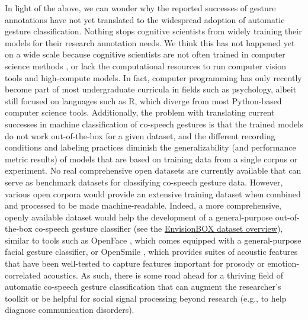 \documentclass[11pt,smallheadings,cleardoublepage=empty,tocflat,numbers=noenddot,twoside,captions=tableheading]{scrbook}
\begin{document}
\begin{refsection}
In light of the above, we can wonder why the reported successes of gesture annotations have not yet translated to the widespread adoption of automatic gesture classification. Nothing stops cognitive scientists from widely training their models for their research annotation needs. We think this has not happened yet on a wide scale because cognitive scientists are not often trained in computer science methods \parencite{sieversDeepSocialNeuroscience2024}, or lack the computational resources to run computer vision tools and high-compute models. In fact, computer programming has only recently become part of most undergraduate curricula in fields such as psychology, albeit still focused on languages such as R, which diverge from most Python-based computer science tools. Additionally, the problem with translating current successes in machine classification of co-speech gestures is that the trained models do not work out-of-the-box for a given dataset, and the different recording conditions and labeling practices diminish the generalizability (and performance metric results) of models that are based on training data from a single corpus or experiment. No real comprehensive open datasets are currently available that can serve as benchmark datasets for classifying co-speech gesture data. However, various open corpora would provide an extensive training dataset when combined and processed to be made machine-readable. Indeed, a more comprehensive, openly available dataset would help the development of a general-purpose out-of-the-box co-speech gesture classifier (see the \href{https://envisionbox.org/multimodaldatasets.html}{EnvisionBOX dataset overview}), similar to tools such as OpenFace \parencite{baltrusaitisOpenFaceOpenSource2016}, which comes equipped with a general-purpose facial gesture classifier, or OpenSmile \parencite{eybenOpensmileMunichVersatile2010}, which provides suites of acoustic features that have been well-tested to capture features important for prosody or emotion-correlated acoustics. As such, there is some road ahead for a thriving field of automatic co-speech gesture classification that can augment the researcher's toolkit or be helpful for social signal processing beyond research (e.g., to help diagnose communication disorders).



\end{refsection}
\end{document}

